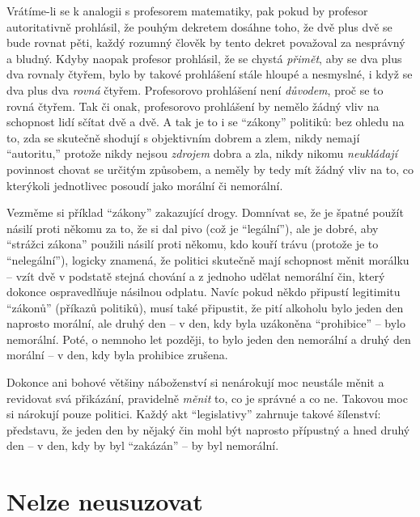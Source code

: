 \documentclass{book}
\begin{document}
Vrátíme-li se k analogii s profesorem matematiky, pak pokud by profesor autoritativně prohlásil, že pouhým dekretem dosáhne toho, že dvě plus dvě se bude rovnat pěti, každý rozumný člověk by tento dekret považoval za nesprávný a bludný. Kdyby naopak profesor prohlásil, že se chystá \emph{přimět}, aby se dva plus dva rovnaly čtyřem, bylo by takové prohlášení stále hloupé a nesmyslné, i když se dva plus dva \emph{rovná} čtyřem. Profesorovo prohlášení není \emph{důvodem}, proč se to rovná čtyřem. Tak či onak, profesorovo prohlášení by nemělo žádný vliv na schopnost lidí sčítat dvě a dvě. A tak je to i se \enquote{zákony} politiků: bez ohledu na to, zda se skutečně shodují s objektivním dobrem a zlem, nikdy nemají \enquote{autoritu,} protože nikdy nejsou \emph{zdrojem} dobra a zla, nikdy nikomu \emph{neukládají} povinnost chovat se určitým způsobem, a neměly by tedy mít žádný vliv na to, co kterýkoli jednotlivec posoudí jako morální či nemorální.

Vezměme si příklad \enquote{zákony} zakazující drogy. Domnívat se, že je špatné použít násilí proti někomu za to, že si dal pivo (což je \enquote{legální}), ale je dobré, aby \enquote{strážci zákona} použili násilí proti někomu, kdo kouří trávu (protože je to \enquote{nelegální}), logicky znamená, že politici skutečně mají schopnost měnit morálku -- vzít dvě v podstatě stejná chování a z jednoho udělat nemorální čin, který dokonce ospravedlňuje násilnou odplatu. Navíc pokud někdo připustí legitimitu \enquote{zákonů} (příkazů politiků), musí také připustit, že pití alkoholu bylo jeden den naprosto morální, ale druhý den -- v den, kdy byla uzákoněna \enquote{prohibice} -- bylo nemorální. Poté, o nemnoho let později, to bylo jeden den nemorální a druhý den morální -- v den, kdy byla prohibice zrušena.

Dokonce ani bohové většiny náboženství si nenárokují moc neustále měnit a revidovat svá přikázání, pravidelně \emph{měnit} to, co je správné a co ne. Takovou moc si nárokují pouze politici. Každý akt \enquote{legislativy} zahrnuje takové šílenství: představu, že jeden den by nějaký čin mohl být naprosto přípustný a hned druhý den -- v den, kdy by byl \enquote{zakázán} -- by byl nemorální.

\section{Nelze neusuzovat}
\end{document}
